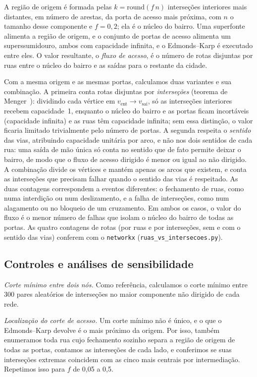 A região de origem é formada pelas $k=\mathrm{round}(f\,n)$ interseções
interiores mais distantes, em número de arestas, da porta de acesso mais
próxima, com $n$ o tamanho desse componente e $f=0{,}2$; ela é o núcleo
do bairro. Uma superfonte alimenta a região de origem, e o conjunto de
portas de acesso alimenta um superssumidouro, ambos com capacidade
infinita, e o Edmonds--Karp é executado entre eles. O valor resultante,
o \emph{fluxo de acesso}, é o número de rotas disjuntas por ruas entre o
núcleo do bairro e as saídas para o restante da cidade.

Com a mesma origem e as mesmas portas, calculamos duas variantes e sua
combinação. A primeira conta rotas disjuntas por \emph{interseções}
(teorema de Menger~\cite{menger1927}): dividindo cada vértice em $v_{\text{ent}}\to
v_{\text{sai}}$, só as interseções interiores recebem capacidade~1,
enquanto o núcleo do bairro e as portas ficam incortáveis (capacidade
infinita) e as ruas têm capacidade infinita; sem essa distinção, o valor
ficaria limitado trivialmente pelo número de portas. A segunda respeita o
\emph{sentido} das vias, atribuindo capacidade unitária por arco, e não
nos dois sentidos de cada rua: uma saída de mão única só conta no sentido
que de fato permite deixar o bairro, de modo que o fluxo de acesso
dirigido é menor ou igual ao não dirigido. A combinação divide os
vértices e mantém apenas os arcos que existem, e conta as interseções
que precisam falhar quando o sentido das vias é respeitado.
As duas contagens correspondem a eventos diferentes: o fechamento de
ruas, como numa interdição ou num deslizamento, e a falha de
interseções, como num alagamento ou no bloqueio de um cruzamento. Em
ambos os casos, o valor do fluxo é o menor número de falhas que isolam
o núcleo do bairro de todas as portas. As quatro contagens de rotas (por ruas e por interseções, sem e
com o sentido das vias) conferem com o \texttt{networkx}
(\texttt{ruas\_vs\_intersecoes.py}).

\subsection{Controles e análises de sensibilidade}
\label{sec:controls}

\emph{Corte mínimo entre dois nós.} Como referência, calculamos o corte
mínimo entre 300 pares aleatórios de interseções no maior componente não
dirigido de cada rede.

\emph{Localização do corte de acesso.} Um corte mínimo não é único, e o
que o Edmonds--Karp devolve é o mais próximo da origem. Por isso,
também enumeramos toda rua cujo fechamento sozinho separa a região de
origem de todas as portas, contamos as interseções de cada lado, e
conferimos se suas interseções extremas coincidem com as cinco mais
centrais por intermediação. Repetimos isso para $f$ de 0,05 a 0,5.

